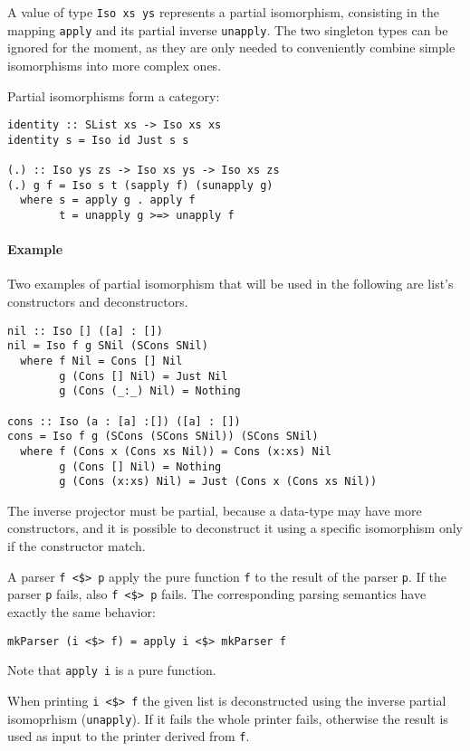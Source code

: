 \documentclass[../Thesis.tex]{subfiles}
\begin{document}
A value of type \texttt{Iso xs ys} represents a partial isomorphism, consisting in the mapping \texttt{apply} and its partial inverse \texttt{unapply}.
The two singleton types can be ignored for the moment, as they are only needed to conveniently combine simple isomorphisms into more complex ones.

Partial isomorphisms form a category:
\begin{verbatim}
identity :: SList xs -> Iso xs xs
identity s = Iso id Just s s

(.) :: Iso ys zs -> Iso xs ys -> Iso xs zs
(.) g f = Iso s t (sapply f) (sunapply g)
  where s = apply g . apply f
        t = unapply g >=> unapply f
\end{verbatim}

\paragraph{Example} Two examples of partial isomorphism that will be used in the following are list's constructors and deconstructors.

\begin{verbatim}
nil :: Iso [] ([a] : [])
nil = Iso f g SNil (SCons SNil)
  where f Nil = Cons [] Nil
        g (Cons [] Nil) = Just Nil
        g (Cons (_:_) Nil) = Nothing

cons :: Iso (a : [a] :[]) ([a] : [])
cons = Iso f g (SCons (SCons SNil)) (SCons SNil)
  where f (Cons x (Cons xs Nil)) = Cons (x:xs) Nil
        g (Cons [] Nil) = Nothing
        g (Cons (x:xs) Nil) = Just (Cons x (Cons xs Nil))
\end{verbatim}

The inverse projector must be partial, because a data-type may have
more constructors, and it is possible to deconstruct it using a specific isomorphism only if the constructor match.

A parser \texttt{f <\$> p} apply the pure function \texttt{f} to the result of the parser \texttt{p}. If the parser \texttt{p} fails, also \texttt{f <\$> p} fails.
The corresponding parsing semantics have exactly the same behavior:

\begin{verbatim}
mkParser (i <$> f) = apply i <$> mkParser f
\end{verbatim}

Note that \texttt{apply i} is a pure function.

When printing \texttt{i <\$> f} the given list is deconstructed using the inverse partial isomoprhism (\texttt{unapply}). If it fails the whole printer fails, otherwise the result is used as input to the printer derived from \texttt{f}.
\end{document}

